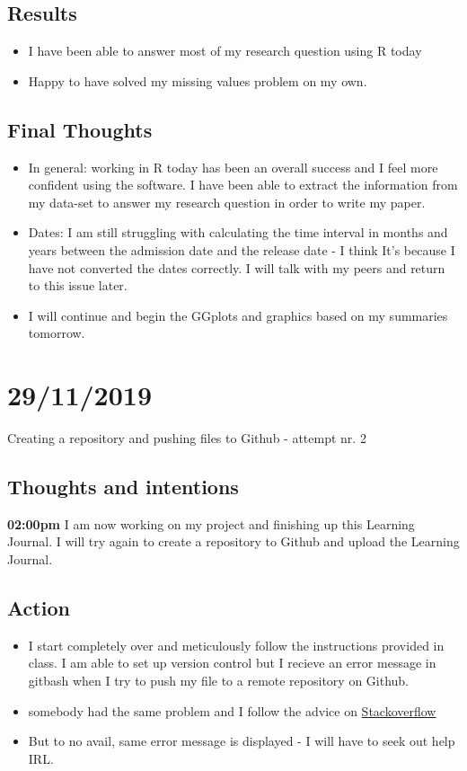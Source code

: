 \documentclass{article}
\begin{document}
\subsection{Results}
\begin{itemize}
    \item I have been able to answer most of my research question using R today 
    \item Happy to have solved my missing values problem on my own. 
\end{itemize}

 
\subsection{Final Thoughts}
\begin{itemize}
    \item In general: working in R today has been an overall success and I feel more confident using the software. I have been able to extract the information from my data-set to answer my research question in order to write my paper. 
    \item Dates: I am still struggling with calculating the time interval in months and years between the admission date and the release date - I think It's because I have not converted the dates correctly. I will talk with my peers and return to this issue later.
\item I will continue and begin the GGplots and graphics based on my summaries tomorrow.
\end{itemize}

\section{29/11/2019}
Creating a repository and pushing files to Github - attempt nr. 2
\subsection{Thoughts and intentions}
    \textbf{02:00pm} I am now working on my project and finishing up this Learning Journal. I will try again to create a repository to Github and upload the Learning Journal. 

\subsection{Action}
\begin{itemize}
\item I start completely over and meticulously follow the instructions provided in class. 
\Item I am able to set up version control but I recieve an error message in gitbash when I try to push my file to a remote repository on Github. 
\item somebody had the same problem and I follow the advice on \href{https://stackoverflow.com/questions/36880121/fatal-i-dont-handle-protocol-while-pushing-to-upstream}{Stackoverflow}
\item But to no avail, same error message is displayed - I will have to seek out help IRL. 
\end{itemize}
\end{document}
